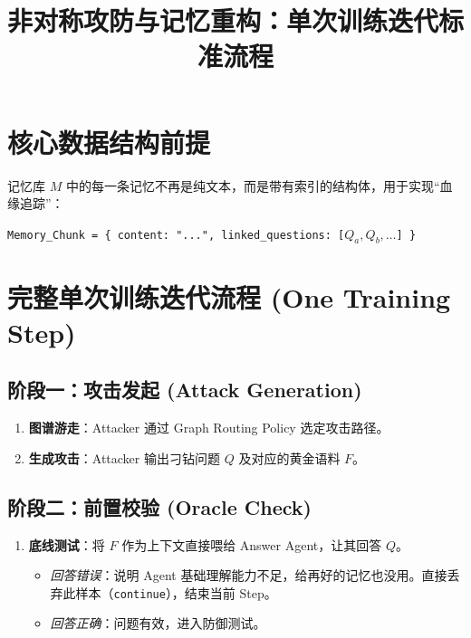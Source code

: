\documentclass[a4paper,11pt]{article}
\title{\textbf{非对称攻防与记忆重构：单次训练迭代标准流程}}
\author{}
\date{}
\begin{document}
\maketitle

\section*{核心数据结构前提}
记忆库 \(M\) 中的每一条记忆不再是纯文本，而是带有索引的结构体，用于实现“血缘追踪”：
\begin{tcolorbox}[colback=gray!10, colframe=gray!50, arc=4pt]
\texttt{Memory\_Chunk = \{ content: "...", linked\_questions: [\(Q_a, Q_b, \dots\)] \}}
\end{tcolorbox}

\vspace{0.5cm}

\section*{完整单次训练迭代流程 (One Training Step)}

\subsection*{阶段一：攻击发起 (Attack Generation)}
\begin{enumerate}
    \item \textbf{图谱游走}：Attacker 通过 Graph Routing Policy 选定攻击路径。
    \item \textbf{生成攻击}：Attacker 输出刁钻问题 \(Q\) 及对应的黄金语料 \(F\)。
\end{enumerate}

\subsection*{阶段二：前置校验 (Oracle Check)}
\begin{enumerate}[resume]
    \item \textbf{底线测试}：将 \(F\) 作为上下文直接喂给 Answer Agent，让其回答 \(Q\)。
    \begin{itemize}
        \item \textit{回答错误}：说明 Agent 基础理解能力不足，给再好的记忆也没用。直接丢弃此样本（\texttt{continue}），结束当前 Step。
        \item \textit{回答正确}：问题有效，进入防御测试。
    \end{itemize}
\end{enumerate}
\end{document}
